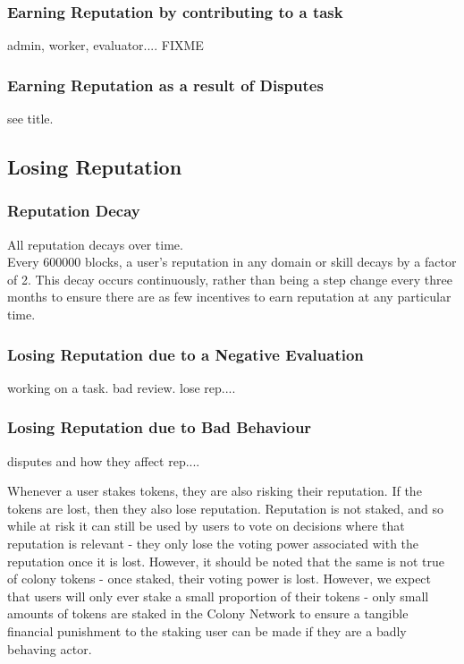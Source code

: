 \subsubsection{Earning Reputation by contributing to a task}
admin, worker, evaluator.... FIXME

\subsubsection{Earning Reputation as a result of Disputes}
see title.



\subsection{Losing Reputation}

\subsubsection{Reputation Decay}
All reputation decays over time.\\
Every 600000 blocks, a user’s reputation in any domain or skill decays by a factor of 2. This decay occurs continuously, rather than being a step change every three months to ensure there are as few incentives to earn reputation at any particular time.

\subsubsection{Losing Reputation due to a Negative Evaluation}
working on a task. bad review. lose rep....


\subsubsection{Losing Reputation due to Bad Behaviour}
disputes and how they affect rep....


Whenever a user stakes tokens, they are also risking their reputation. If the tokens are lost, then they also lose reputation. Reputation is not staked, and so while at risk it can still be used by users to vote on decisions where that reputation is relevant - they only lose the voting power associated with the reputation once it is lost. However, it should be noted that the same is not true of colony tokens - once staked, their voting power is lost. However, we expect that users will only ever stake a small proportion of their tokens - only small amounts of tokens are staked in the Colony Network to ensure a tangible financial punishment to the staking user can be made if they are a badly behaving actor.

